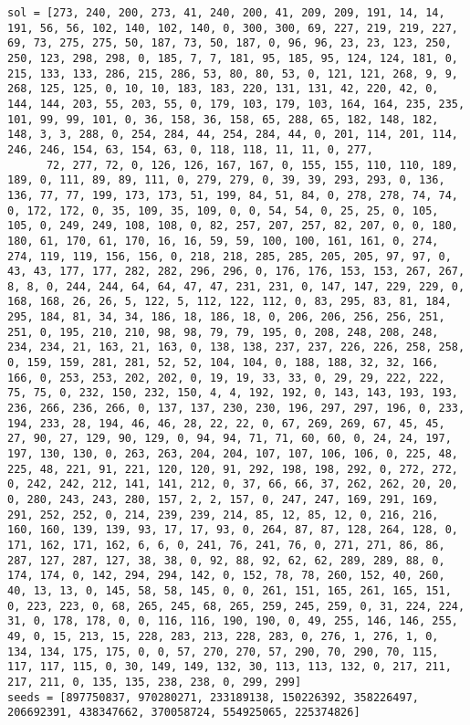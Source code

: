 \begin{lstlisting}[label={lst:call300vehicle90},caption=Optimal solution call\_300\_vehicle\_90]
sol = [273, 240, 200, 273, 41, 240, 200, 41, 209, 209, 191, 14, 14, 191, 56, 56, 102, 140, 102, 140, 0, 300, 300, 69, 227, 219, 219, 227, 69, 73, 275, 275, 50, 187, 73, 50, 187, 0, 96, 96, 23, 23, 123, 250, 250, 123, 298, 298, 0, 185, 7, 7, 181, 95, 185, 95, 124, 124, 181, 0, 215, 133, 133, 286, 215, 286, 53, 80, 80, 53, 0, 121, 121, 268, 9, 9, 268, 125, 125, 0, 10, 10, 183, 183, 220, 131, 131, 42, 220, 42, 0, 144, 144, 203, 55, 203, 55, 0, 179, 103, 179, 103, 164, 164, 235, 235, 101, 99, 99, 101, 0, 36, 158, 36, 158, 65, 288, 65, 182, 148, 182, 148, 3, 3, 288, 0, 254, 284, 44, 254, 284, 44, 0, 201, 114, 201, 114, 246, 246, 154, 63, 154, 63, 0, 118, 118, 11, 11, 0, 277,
      72, 277, 72, 0, 126, 126, 167, 167, 0, 155, 155, 110, 110, 189, 189, 0, 111, 89, 89, 111, 0, 279, 279, 0, 39, 39, 293, 293, 0, 136, 136, 77, 77, 199, 173, 173, 51, 199, 84, 51, 84, 0, 278, 278, 74, 74, 0, 172, 172, 0, 35, 109, 35, 109, 0, 0, 54, 54, 0, 25, 25, 0, 105, 105, 0, 249, 249, 108, 108, 0, 82, 257, 207, 257, 82, 207, 0, 0, 180, 180, 61, 170, 61, 170, 16, 16, 59, 59, 100, 100, 161, 161, 0, 274, 274, 119, 119, 156, 156, 0, 218, 218, 285, 285, 205, 205, 97, 97, 0, 43, 43, 177, 177, 282, 282, 296, 296, 0, 176, 176, 153, 153, 267, 267, 8, 8, 0, 244, 244, 64, 64, 47, 47, 231, 231, 0, 147, 147, 229, 229, 0, 168, 168, 26, 26, 5, 122, 5, 112, 122, 112, 0, 83, 295, 83, 81, 184, 295, 184, 81, 34, 34, 186, 18, 186, 18, 0, 206, 206, 256, 256, 251, 251, 0, 195, 210, 210, 98, 98, 79, 79, 195, 0, 208, 248, 208, 248, 234, 234, 21, 163, 21, 163, 0, 138, 138, 237, 237, 226, 226, 258, 258, 0, 159, 159, 281, 281, 52, 52, 104, 104, 0, 188, 188, 32, 32, 166, 166, 0, 253, 253, 202, 202, 0, 19, 19, 33, 33, 0, 29, 29, 222, 222, 75, 75, 0, 232, 150, 232, 150, 4, 4, 192, 192, 0, 143, 143, 193, 193, 236, 266, 236, 266, 0, 137, 137, 230, 230, 196, 297, 297, 196, 0, 233, 194, 233, 28, 194, 46, 46, 28, 22, 22, 0, 67, 269, 269, 67, 45, 45, 27, 90, 27, 129, 90, 129, 0, 94, 94, 71, 71, 60, 60, 0, 24, 24, 197, 197, 130, 130, 0, 263, 263, 204, 204, 107, 107, 106, 106, 0, 225, 48, 225, 48, 221, 91, 221, 120, 120, 91, 292, 198, 198, 292, 0, 272, 272, 0, 242, 242, 212, 141, 141, 212, 0, 37, 66, 66, 37, 262, 262, 20, 20, 0, 280, 243, 243, 280, 157, 2, 2, 157, 0, 247, 247, 169, 291, 169, 291, 252, 252, 0, 214, 239, 239, 214, 85, 12, 85, 12, 0, 216, 216, 160, 160, 139, 139, 93, 17, 17, 93, 0, 264, 87, 87, 128, 264, 128, 0, 171, 162, 171, 162, 6, 6, 0, 241, 76, 241, 76, 0, 271, 271, 86, 86, 287, 127, 287, 127, 38, 38, 0, 92, 88, 92, 62, 62, 289, 289, 88, 0, 174, 174, 0, 142, 294, 294, 142, 0, 152, 78, 78, 260, 152, 40, 260, 40, 13, 13, 0, 145, 58, 58, 145, 0, 0, 261, 151, 165, 261, 165, 151, 0, 223, 223, 0, 68, 265, 245, 68, 265, 259, 245, 259, 0, 31, 224, 224, 31, 0, 178, 178, 0, 0, 116, 116, 190, 190, 0, 49, 255, 146, 146, 255, 49, 0, 15, 213, 15, 228, 283, 213, 228, 283, 0, 276, 1, 276, 1, 0, 134, 134, 175, 175, 0, 0, 57, 270, 270, 57, 290, 70, 290, 70, 115, 117, 117, 115, 0, 30, 149, 149, 132, 30, 113, 113, 132, 0, 217, 211, 217, 211, 0, 135, 135, 238, 238, 0, 299, 299]
seeds = [897750837, 970280271, 233189138, 150226392, 358226497, 206692391, 438347662, 370058724, 554925065, 225374826]
\end{lstlisting}%
\clearpage


